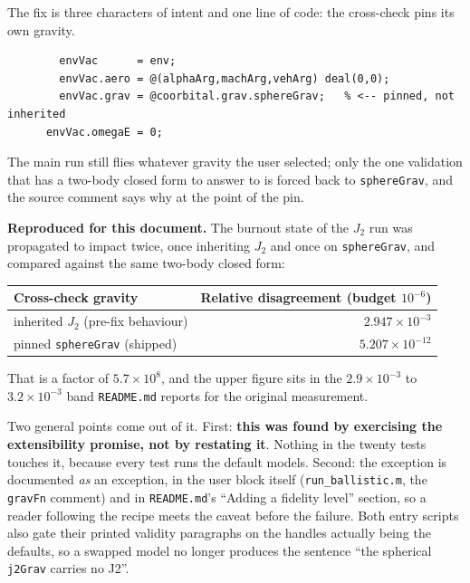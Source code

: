 \documentclass[11pt]{article}
\newcommand{\code}[1]{\texttt{#1}}
\begin{document}
The fix is three characters of intent and one line of code: the cross-check
pins its own gravity.

\begin{lstlisting}
        envVac      = env;
        envVac.aero = @(alphaArg,machArg,vehArg) deal(0,0);
        envVac.grav = @coorbital.grav.sphereGrav;   % <-- pinned, not inherited
      envVac.omegaE = 0;
\end{lstlisting}

The main run still flies whatever gravity the user selected; only the one
validation that has a two-body closed form to answer to is forced back to
\code{sphereGrav}, and the source comment says why at the point of the pin.

\textbf{Reproduced for this document.} The burnout state of the $J_2$ run was
propagated to impact twice, once inheriting $J_2$ and once on
\code{sphereGrav}, and compared against the same two-body closed form:

\begin{center}
\begin{tabular}{lr}
\toprule
Cross-check gravity & Relative disagreement (budget $10^{-6}$) \\
\midrule
inherited $J_2$ (pre-fix behaviour)   & $2.947\times10^{-3}$ \\
pinned \code{sphereGrav} (shipped)    & $5.207\times10^{-12}$ \\
\bottomrule
\end{tabular}
\end{center}

That is a factor of $5.7\times10^{8}$, and the upper figure sits in the
$2.9\times10^{-3}$ to $3.2\times10^{-3}$ band \code{README.md} reports for the
original measurement.

Two general points come out of it. First: \textbf{this was found by exercising
the extensibility promise, not by restating it}. Nothing in the twenty tests
touches it, because every test runs the default models. Second: the exception
is documented \emph{as} an exception, in the user block itself
(\code{run\_ballistic.m}, the \code{gravFn} comment) and in
\code{README.md}'s ``Adding a fidelity level'' section, so a reader following
the recipe meets the caveat before the failure. Both entry scripts also gate
their printed validity paragraphs on the handles actually being the defaults,
so a swapped model no longer produces the sentence ``the spherical
\code{j2Grav} carries no J2''.

\end{document}
